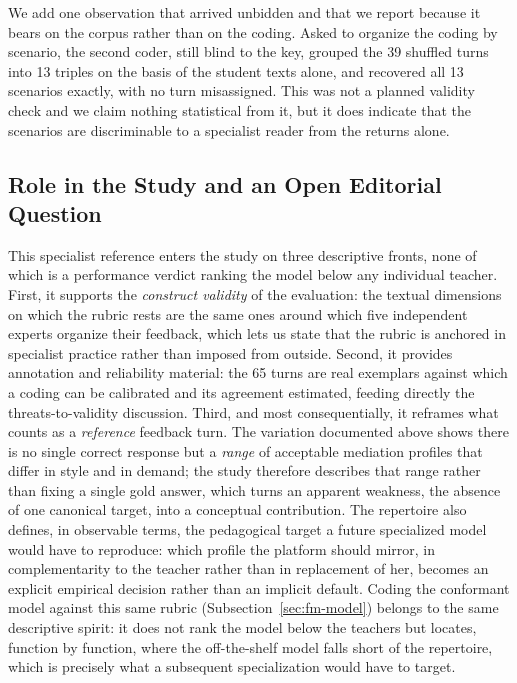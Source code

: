 \documentclass{sbc2023}%
\begin{document}
We add one observation that arrived unbidden and that we report because it bears on the corpus rather than on the coding. Asked to organize the coding by scenario, the second coder, still blind to the key, grouped the 39 shuffled turns into 13 triples on the basis of the student texts alone, and recovered all 13 scenarios exactly, with no turn misassigned. This was not a planned validity check and we claim nothing statistical from it, but it does indicate that the scenarios are discriminable to a specialist reader from the returns alone.

\subsection{Role in the Study and an Open Editorial Question}
\label{sec:fm-role}

This specialist reference enters the study on three descriptive fronts, none of which is a performance verdict ranking the model below any individual teacher. First, it supports the \textit{construct validity} of the evaluation: the textual dimensions on which the rubric rests are the same ones around which five independent experts organize their feedback, which lets us state that the rubric is anchored in specialist practice rather than imposed from outside. Second, it provides annotation and reliability material: the 65 turns are real exemplars against which a coding can be calibrated and its agreement estimated, feeding directly the threats-to-validity discussion. Third, and most consequentially, it reframes what counts as a \textit{reference} feedback turn. The variation documented above shows there is no single correct response but a \textit{range} of acceptable mediation profiles that differ in style and in demand; the study therefore describes that range rather than fixing a single gold answer, which turns an apparent weakness, the absence of one canonical target, into a conceptual contribution. The repertoire also defines, in observable terms, the pedagogical target a future specialized model would have to reproduce: which profile the platform should mirror, in complementarity to the teacher rather than in replacement of her, becomes an explicit empirical decision rather than an implicit default. Coding the conformant model against this same rubric (Subsection~\ref{sec:fm-model}) belongs to the same descriptive spirit: it does not rank the model below the teachers but locates, function by function, where the off-the-shelf model falls short of the repertoire, which is precisely what a subsequent specialization would have to target.
\end{document}
